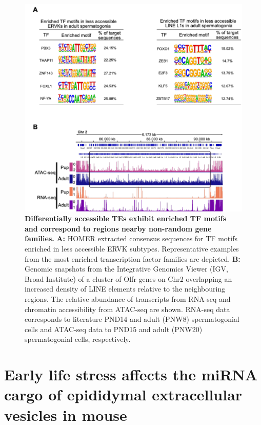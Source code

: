 \documentclass[12pt,twoside]{reedthesis}
\begin{document}
\begin{figure}[H]

{\centering \includegraphics{thesis_files/figure-latex/ds6-1} 

}

\caption[Differentially accessible TEs exhibit enriched TF motifs and correspond to regions nearby non-random gene families]{\textbf{Differentially accessible TEs exhibit enriched TF motifs and correspond to regions nearby non-random gene families.} \textbf{A:} HOMER extracted consensus sequences for TF motifs enriched in less accessible ERVK subtypes. Representative examples from the most enriched transcription factor families are depicted. \textbf{B:} Genomic snapshots from the Integrative Genomics Viewer (IGV, Broad Institute) of a cluster of Olfr genes on Chr2 overlapping an increased density of LINE elements relative to the neighbouring regions. The relative abundance of transcripts from RNA-seq and chromatin accessibility from ATAC-seq are shown. RNA-seq data corresponds to literature PND14 and adult (PNW8) spermatogonial cells and ATAC-seq data to PND15 and adult (PNW20) spermatogonial cells, respectively.}\label{fig:ds6}
\end{figure}
\hypertarget{chapter2}{%
\chapter{Early life stress affects the miRNA cargo of epididymal extracellular vesicles in mouse}\label{chapter2}}
\end{document}
